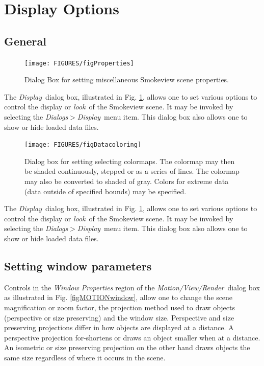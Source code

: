 \documentclass[11pt,twoside]{book}
\begin{document}
\section{Display Options}
\subsection{General}
\begin{figure}[\figoptions]
\centerline{\texttt{[image: FIGURES/figProperties]}
} \caption [Dialog Box for setting miscellaneous Smokeview scene
properties.] {Dialog Box for setting miscellaneous Smokeview scene
properties.} \label{figProperties}
\end{figure}
The {\em Display}\ dialog box, illustrated in Fig.
\ref{figProperties}, allows one to set various options to control
the display or {\em look}\ of the Smokeview scene.  It may be
invoked by selecting the {\em Dialogs$>$Display}\ menu item. This
dialog box also allows one to show or hide loaded data files.

\begin{figure}[\figoptions]
\centerline{\texttt{[image: FIGURES/figDatacoloring]}
} \caption [Dialog Box for setting selecting colormaps.] {Dialog
box for setting selecting colormaps.  The colormap may then be
shaded continuously, stepped or as a series of lines.  The
colormap may also be converted to shaded of gray.  Colors for
extreme data (data outside of specified bounds) may be specified.}
\label{figDatacoloring}
\end{figure}

The {\em Display}\ dialog box, illustrated in Fig.
\ref{figProperties}, allows one to set various options to control
the display or {\em look}\ of the Smokeview scene.  It may be
invoked by selecting the {\em Dialogs$>$Display}\ menu item. This
dialog box also allows one to show or hide loaded data files.

\subsection{Setting window parameters}
Controls in the {\em Window Properties} region of the {\em Motion/View/Render}\ dialog box as illustrated in Fig. \ref{figMOTIONwindow},
allow one to change the scene magnification or zoom factor, the
projection method used to draw objects (perspective or size preserving) and the window size.
Perspective and size preserving projections differ in how objects are displayed
at a distance.  A perspective projection for-shortens or draws an
object smaller when at a distance. An isometric or size preserving projection
on the other hand draws objects the same size regardless of
where it occurs in the scene.
\end{document}
